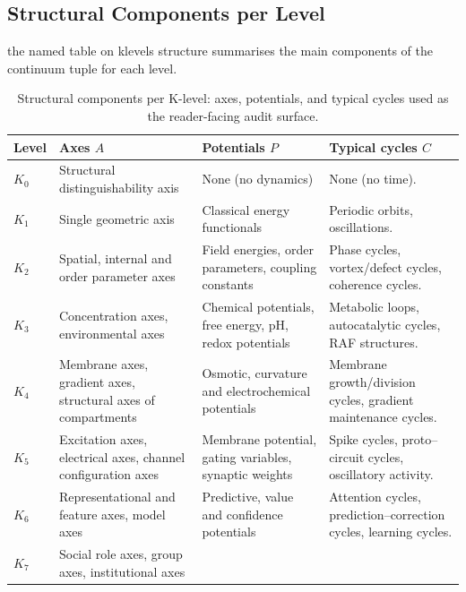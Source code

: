 \subsection{Structural Components per Level}

the named table on klevels structure summarises the main components of the
continuum tuple for each level.

\begin{octablescope}
\begin{longtable}{@{}L{0.08\textwidth}L{0.18\textwidth}L{0.22\textwidth}L{0.42\textwidth}@{}}
\caption{Structural components per K-level: axes, potentials, and typical cycles used as the reader-facing audit surface.}\label{tab:klevels-structure}\\
\toprule
    Level & Axes \(A\) & Potentials \(P\) & Typical cycles \(C\) \\
    \midrule
    \(K_0\) &
      Structural distinguishability axis &
      None (no dynamics) &
      None (no time). \\[0.3em]
    \(K_1\) &
      Single geometric axis &
      Classical energy functionals &
      Periodic orbits, oscillations. \\[0.3em]
    \(K_2\) &
      Spatial, internal and order parameter axes &
      Field energies, order parameters, coupling constants &
      Phase cycles, vortex/defect cycles, coherence cycles. \\[0.3em]
    \(K_3\) &
      Concentration axes, environmental axes &
      Chemical potentials, free energy, pH, redox potentials &
      Metabolic loops, autocatalytic cycles, RAF structures. \\[0.3em]
    \(K_4\) &
      Membrane axes, gradient axes, structural axes of compartments &
      Osmotic, curvature and electrochemical potentials &
      Membrane growth/division cycles, gradient maintenance cycles. \\[0.3em]
    \(K_5\) &
      Excitation axes, electrical axes, channel configuration axes &
      Membrane potential, gating variables, synaptic weights &
      Spike cycles, proto--circuit cycles, oscillatory activity. \\[0.3em]
    \(K_6\) &
      Representational and feature axes, model axes &
      Predictive, value and confidence potentials &
      Attention cycles, prediction--correction cycles, learning cycles. \\[0.3em]
    \(K_7\) &
      Social role axes, group axes, institutional axes &

\end{longtable}
\end{octablescope}
